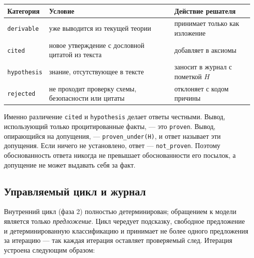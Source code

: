 \documentclass[11pt,a4paper]{article}
\begin{document}
\begin{center}
\begin{tabular}{p{2.4cm}p{6.2cm}p{4.6cm}}
\toprule
\textbf{Категория} & \textbf{Условие} & \textbf{Действие решателя} \\
\midrule
\texttt{derivable} & уже выводится из текущей теории & принимает только как изложение \\
\texttt{cited} & новое утверждение с дословной цитатой из текста & добавляет в аксиомы \\
\texttt{hypothesis} & знание, отсутствующее в тексте & заносит в журнал с пометкой $H$ \\
\texttt{rejected} & не проходит проверку схемы, безопасности или цитаты & отклоняет с кодом причины \\
\bottomrule
\end{tabular}
\end{center}

Именно различение \texttt{cited} и \texttt{hypothesis} делает ответы честными. Вывод, использующий только процитированные факты, — это
\texttt{proven}. Вывод, опирающийся на допущения, — \texttt{proven\_under(H)}, и ответ называет эти допущения. Если ничего не установлено,
ответ — \texttt{not\_proven}. Поэтому обоснованность ответа никогда не превышает обоснованности его посылок, а допущение не может выдавать себя за факт.

\subsection{Управляемый цикл и журнал}
\label{sec:cycle}

Внутренний цикл (фаза 2) полностью детерминирован; обращением к модели является только \emph{предложение}. Цикл чередует подсказку, свободное предложение
и детерминированную классификацию и принимает не более одного предложения за итерацию — так каждая итерация оставляет проверяемый след.
Итерация устроена следующим образом:
\end{document}
